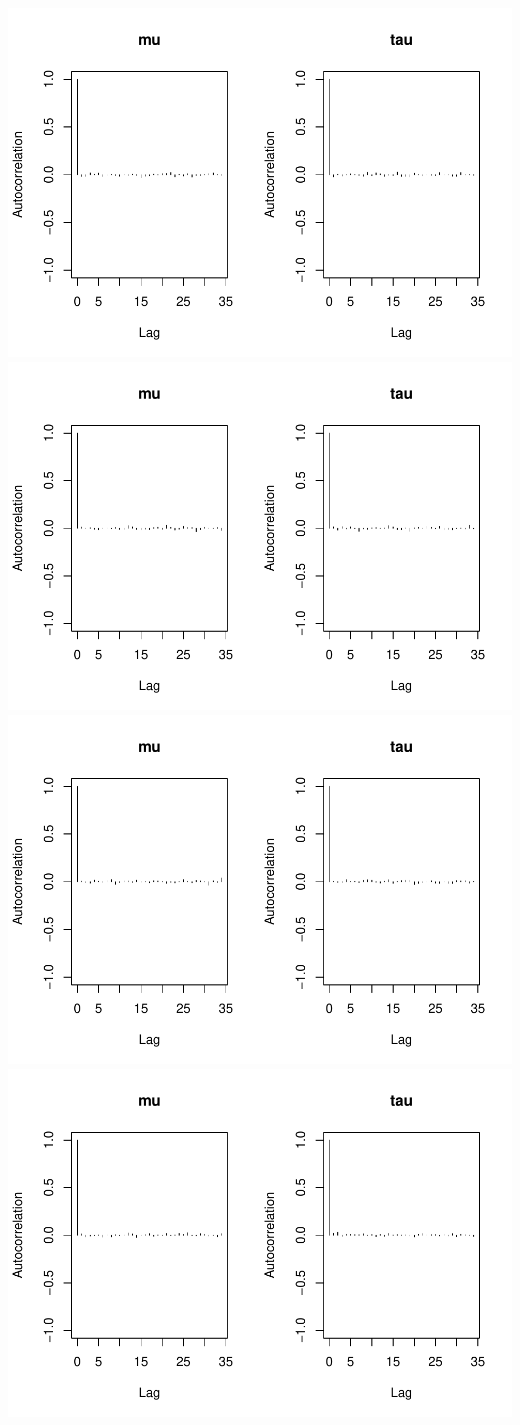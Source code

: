 \documentclass[
  11pt,
]{article}
\begin{document}
\includegraphics{01-02-lec_files/figure-latex/autocorr-1.pdf} \includegraphics{01-02-lec_files/figure-latex/autocorr-2.pdf} \includegraphics{01-02-lec_files/figure-latex/autocorr-3.pdf} \includegraphics{01-02-lec_files/figure-latex/autocorr-4.pdf}
\end{document}

